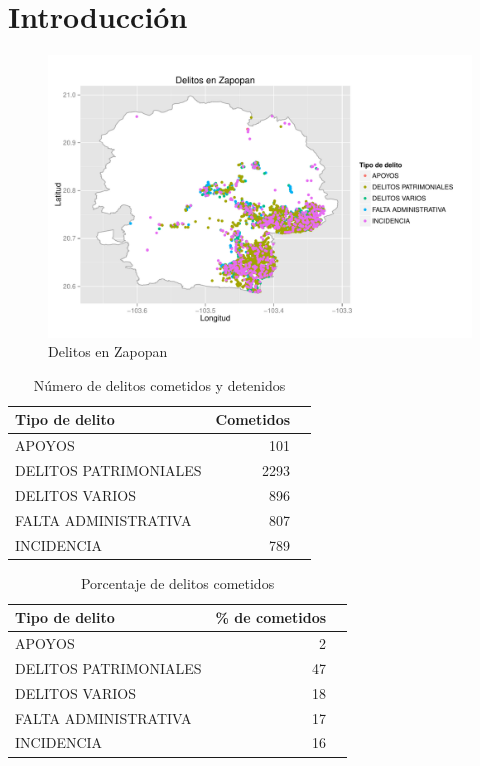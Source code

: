 \newpage
\section{Introducción}





\noindent  
\begin{figure}[H]
\centering
\caption{Delitos en Zapopan}
\includegraphics[width=120mm]{../../graphs/zapopan_delitos.pdf}
\end{figure}


\begin{table}[H]
\centering
\caption{Número de delitos cometidos y detenidos} 
\begin{tabular}{lrr}
  \hline
Tipo de delito & Cometidos  \\ 
  \hline
APOYOS & 101  \\ 
  DELITOS PATRIMONIALES & 2293 \\ 
  DELITOS VARIOS & 896 \\ 
  FALTA ADMINISTRATIVA & 807 \\ 
  INCIDENCIA & 789\\ 
   \hline
\end{tabular}
\end{table}

\begin{table}[H]
\centering
\caption{Porcentaje de delitos cometidos} 
\begin{tabular}{lrr}
  \hline
Tipo de delito & \% de cometidos  \\ 
  \hline
APOYOS & 2 \\ 
  DELITOS PATRIMONIALES & 47 \\ 
  DELITOS VARIOS & 18  \\ 
  FALTA ADMINISTRATIVA & 17  \\ 
  INCIDENCIA & 16  \\ 
   \hline
\end{tabular}
\end{table}

